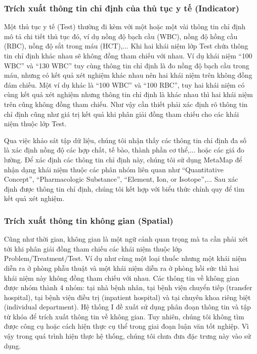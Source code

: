 \subsubsection*{Trích xuất thông tin chỉ định của thủ tục y tế (Indicator)}
Một thủ tục y tế (Test) thường đi kèm với một hoặc một vài thông tin chỉ định mô tả chi tiết thủ tục đó, ví dụ nồng độ bạch cầu (WBC), nồng độ hồng cầu (RBC), nồng độ sắt trong máu (HCT),... Khi hai khái niệm lớp Test chứa thông tin chỉ định khác nhau sẽ không đồng tham chiếu với nhau. Ví dụ khái niệm ``100 WBC'' và ``130 WBC'' tuy cùng thông tin chỉ định là đo nồng độ bạch cầu trong máu, nhưng có kết quả xét nghiệm khác nhau nên hai khái niệm trên không đồng đám chiếu. Một ví dụ khác là ``100 WBC'' và ``100 RBC'', tuy hai khái niệm có cùng kết quả xét nghiệm nhưng thông tin chỉ định là khác nhau thì hai khái niệm trên cũng không đồng tham chiếu. Như vậy cần thiết phải xác định rõ thông tin chỉ định cũng như giá trị kết quả khi phân giải đồng tham chiếu cho các khái niệm thuộc lớp Test.

Qua việc khảo sát tập dữ liệu, chúng tôi nhận thấy các thông tin chỉ định đa số là xác định nồng độ các hợp chất, tế bào, thành phần cơ thể,... hoặc các giá đo lường. Để xác định các thông tin chỉ định này, chúng tôi sử dụng MetaMap để nhận dạng khái niệm thuộc các phân nhóm liên quan như ``Quantitative Concept'', ``Pharmacologic Substance'', ``Element, Ion, or Isotope'',... Sau xác định được thông tin chỉ định, chúng tôi kết hợp với biểu thức chính quy để tìm kết quả xét nghiệm.

\subsubsection*{Trích xuất thông tin không gian (Spatial)}
Cũng như thời gian, không gian là một ngữ cảnh quan trọng mà ta cần phải xét tới khi phân giải đồng tham chiếu các khái niệm thuộc lớp Problem/Treatment/Test. Ví dụ như cùng một loại thuốc nhưng một khái niệm diễn ra ở phòng phẫu thuật và một khái niệm diễn ra ở phòng hồi sức thì hai khái niệm này không đồng tham chiếu với nhau. Các thông tin về không gian được nhóm thành 4 nhóm: tại nhà bệnh nhân, tại bệnh viện chuyển tiếp (transfer hospital), tại bệnh viện điều trị (inpatient hospital) và tại chuyên khoa riêng biệt (individual department). Hệ thống I đề xuất sử dụng phân đoạn thông tin và tập từ khóa để trích xuất thông tin về không gian. Tuy nhiên, chúng tôi không tìm được công cụ hoặc cách hiện thực cụ thể trong giai đoạn luận văn tốt nghiệp. Vì vậy trong quá trình hiện thực hệ thống, chúng tôi chưa đưa đặc trưng này vào sử dụng.

